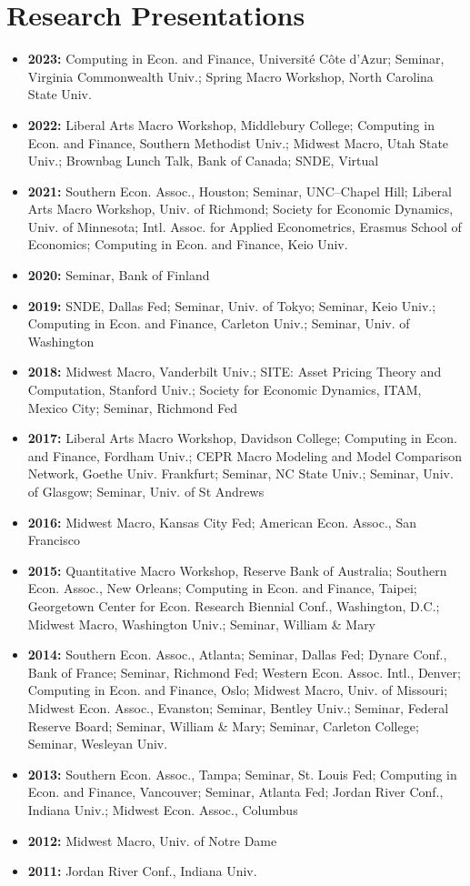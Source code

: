 \documentclass[10pt,letterpaper,en-US]{article}
\begin{document}
\section*{Research Presentations}
\begin{itemize}
\item \textbf{2023:} Computing in Econ. and Finance, Universit\'{e} C\^{o}te d'Azur; Seminar, Virginia Commonwealth Univ.; Spring Macro Workshop, North Carolina State Univ.
\item \textbf{2022:} Liberal Arts Macro Workshop, Middlebury College; Computing in Econ. and Finance, Southern Methodist Univ.; Midwest Macro, Utah State Univ.; Brownbag Lunch Talk, Bank of Canada; SNDE, Virtual
\item \textbf{2021:} Southern Econ. Assoc., Houston; Seminar, UNC--Chapel Hill; Liberal Arts Macro Workshop, Univ. of Richmond; Society for Economic Dynamics, Univ. of Minnesota; Intl. Assoc. for Applied Econometrics, Erasmus School of Economics; Computing in Econ. and Finance, Keio Univ.
\item \textbf{2020:} Seminar, Bank of Finland
\item \textbf{2019:} SNDE, Dallas Fed; Seminar, Univ. of Tokyo; Seminar, Keio Univ.; Computing in Econ. and Finance, Carleton Univ.; Seminar, Univ. of Washington
\item \textbf{2018:} Midwest Macro, Vanderbilt Univ.; SITE: Asset Pricing Theory and Computation, Stanford Univ.; Society for Economic Dynamics, ITAM, Mexico City; Seminar, Richmond Fed
\item \textbf{2017:} Liberal Arts Macro Workshop, Davidson College; Computing in Econ. and Finance, Fordham Univ.; CEPR Macro Modeling and Model Comparison Network, Goethe Univ. Frankfurt; Seminar, NC State Univ.; Seminar, Univ. of Glasgow; Seminar, Univ. of St Andrews
\item \textbf{2016:} Midwest Macro, Kansas City Fed; American Econ. Assoc., San Francisco
\item \textbf{2015:} Quantitative Macro Workshop, Reserve Bank of Australia; Southern Econ. Assoc., New Orleans; Computing in Econ. and Finance, Taipei; Georgetown Center for Econ. Research Biennial Conf., Washington, D.C.; Midwest Macro, Washington Univ.; Seminar, William \& Mary
\item \textbf{2014:} Southern Econ. Assoc., Atlanta; Seminar, Dallas Fed; Dynare Conf., Bank of France; Seminar, Richmond Fed; Western Econ. Assoc. Intl., Denver; Computing in Econ. and Finance, Oslo; Midwest Macro, Univ. of Missouri; Midwest Econ. Assoc., Evanston; Seminar, Bentley Univ.; Seminar, Federal Reserve Board; Seminar, William \& Mary; Seminar, Carleton College; Seminar, Wesleyan Univ.
\item \textbf{2013:} Southern Econ. Assoc., Tampa; Seminar, St. Louis Fed; Computing in Econ. and Finance, Vancouver; Seminar, Atlanta Fed; Jordan River Conf., Indiana Univ.; Midwest Econ. Assoc., Columbus
\item \textbf{2012:} Midwest Macro, Univ. of Notre Dame
\item \textbf{2011:} Jordan River Conf., Indiana Univ.
\end{itemize}
\end{document}
